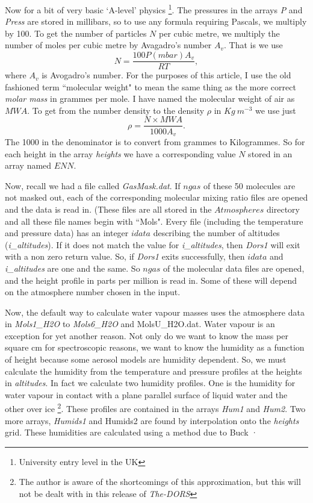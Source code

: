 \documentclass[12pt]{article}
\begin{document}
Now for a bit of very  basic `A-level' physics \footnote[1]{University entry level 
in the UK}.
 The pressures in the arrays {\it P} and {\it Press}  are stored in millibars,
so to use any formula requiring Pascals, we multiply by 100. To get the number of
particles  $N$ per cubic metre, we multiply the number of moles per cubic metre by Avagadro's number $A_v$.
That is we use
\begin{equation}
N= \frac{ 100 P(mbar) A_v}{RT},
\end{equation}
 where $A_v$ is Avogadro's number.
For the purposes of this article, I use the old fashioned term ``molecular weight" to mean
the same thing as the more correct {\it molar mass} in grammes per mole. I have named the
molecular weight of air as $MWA$. To get from the number density to the density $\rho$
 in $Kg \> m^{-3}$ we use just
\begin{equation}
\rho=\frac{N \times MWA}{1000 A_v}.
\end{equation}
The 1000 in the denominator is to convert from grammes to Kilogrammes. So for each height
in the array {\it heights} we have a corresponding value $N$ stored in an array named $ENN$.

Now, recall we had a file called {\it GasMask.dat}. If $ngas$ of these 50 molecules
are not masked out, each of the corresponding molecular mixing ratio files are opened and the
data is read in. (These files are all stored in the $Atmospheres$ directory and all these
file names begin with ``Mols".  Every file (including the temperature and pressure data) has
an integer $idata$ describing the number of altitudes ({\it i\_altitudes}). If it does not match the value
for {\it i\_altitudes}, then {\it Dors1} will exit with a non zero return value. So, if {\it
Dors1} exits successfully, then $idata$ and {\it i\_altitudes} are one and the same.
So $ngas$ of the molecular data files are opened, and the height profile in parts per
million is read in. Some of these will depend on the atmosphere number chosen in the
input. 

Now, the default way to calculate water vapour masses uses the atmosphere data
in {\it Mols1\_H2O} to {\it Mols6\_H2O} and {MolsU\_H2O.dat}. Water vapour
is an exception for yet another reason. Not only do we want to know the mass per square
cm for spectroscopic reasons, we want to know the humidity as a function of height
because some aerosol models are humidity dependent.
 So, we must calculate the humidity from the temperature and pressure
profiles at the heights in {\it altitudes}. In fact we calculate two humidity
profiles. One is the humidity for water vapour in contact with a plane parallel surface
of liquid water and the other over ice \footnote{The author is aware of the shortcomings
of this approximation, but this will not be dealt with in this release of {\it The-DORS}}. 
These profiles are contained in the arrays {\it Hum1}
and {\it Hum2}. Two more arrays, {\it Humids1} and {Humids2} are found by interpolation
onto the {\it heights} grid. These humidities are calculated using a method due to
Buck \cite{ArdenBuck:Mybib}·
\end{document}

